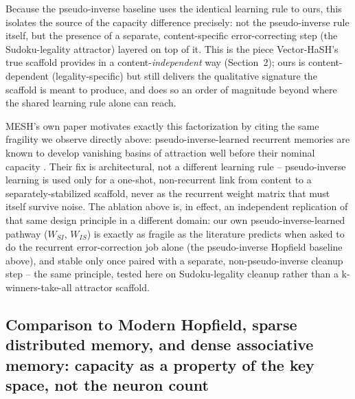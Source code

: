 \documentclass[11pt]{article}
\begin{document}
Because the pseudo-inverse baseline uses the identical learning rule to ours, this isolates
the source of the capacity difference precisely: not the pseudo-inverse rule itself, but the
presence of a separate, content-specific error-correcting step (the Sudoku-legality attractor)
layered on top of it. This is the piece Vector-HaSH's true scaffold provides in a
content-\emph{independent} way (Section~2); ours is content-dependent (legality-specific) but
still delivers the qualitative signature the scaffold is meant to produce, and does so an
order of magnitude beyond where the shared learning rule alone can reach.

MESH's own paper motivates exactly this factorization by citing the same fragility we observe
directly above: pseudo-inverse-learned recurrent memories are known to develop vanishing basins
of attraction well before their nominal capacity \cite{personnaz1986,kanter1987}. Their fix is
architectural, not a different learning rule -- pseudo-inverse learning is used only for a
one-shot, non-recurrent link from content to a separately-stabilized scaffold, never as the
recurrent weight matrix that must itself survive noise. The ablation above is, in effect, an
independent replication of that same design principle in a different domain: our own
pseudo-inverse-learned pathway ($W_{SI}$, $W_{IS}$) is exactly as fragile as the literature
predicts when asked to do the recurrent error-correction job alone (the pseudo-inverse Hopfield
baseline above), and stable only once paired with a separate, non-pseudo-inverse cleanup step
-- the same principle, tested here on Sudoku-legality cleanup rather than a k-winners-take-all
attractor scaffold.

\subsection{Comparison to Modern Hopfield, sparse distributed memory, and dense associative
memory: capacity as a property of the key space, not the neuron count}
\label{sec:modern-comparison}
\end{document}
